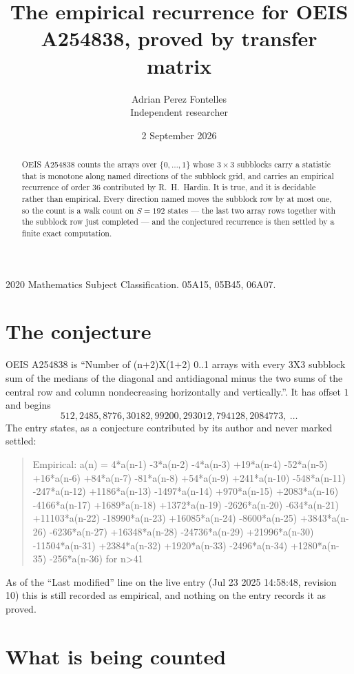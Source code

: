 \documentclass[11pt,a4paper]{article}
\title{The empirical recurrence for OEIS A254838, proved by transfer matrix}
\author{Adrian Perez Fontelles\\ \small Independent researcher}
\date{2 September 2026}
\theoremstyle{plain}
\theoremstyle{definition}
\begin{document}
\maketitle

\begin{abstract}
OEIS A254838 counts the arrays over $\{0,\dots,1\}$ whose $3\times3$ subblocks carry a
statistic that is monotone along named directions of the subblock grid, and carries an
empirical recurrence of order $36$ contributed by R.~H.~Hardin. It is true, and it is
decidable rather than empirical. Every direction named moves the subblock row by at most one,
so the count is a walk count on $S=192$ states --- the last two array rows together with the
subblock row just completed --- and the conjectured recurrence is then settled by a finite
exact computation.
\end{abstract}

\noindent\small 2020 Mathematics Subject Classification. 05A15, 05B45, 06A07.\normalsize

\section{The conjecture}

OEIS A254838 is ``Number of (n+2)X(1+2) 0..1 arrays with every 3X3 subblock sum of the medians of the diagonal and antidiagonal minus the two sums of the central row and column nondecreasing horizontally and vertically.''. It has offset $1$ and begins
\[
512, 2485, 8776, 30182, 99200, 293012, 794128, 2084773,\ \dots
\]
The entry states, as a conjecture contributed by its author and never marked settled:
\begin{quote}
Empirical: a(n) = 4*a(n-1) -3*a(n-2) -4*a(n-3) +19*a(n-4) -52*a(n-5) +16*a(n-6) +84*a(n-7) -81*a(n-8) +54*a(n-9) +241*a(n-10) -548*a(n-11) -247*a(n-12) +1186*a(n-13) -1497*a(n-14) +970*a(n-15) +2083*a(n-16) -4166*a(n-17) +1689*a(n-18) +1372*a(n-19) -2626*a(n-20) -634*a(n-21) +11103*a(n-22) -18990*a(n-23) +16085*a(n-24) -8600*a(n-25) +3843*a(n-26) -6236*a(n-27) +16348*a(n-28) -24736*a(n-29) +21996*a(n-30) -11504*a(n-31) +2384*a(n-32) +1920*a(n-33) -2496*a(n-34) +1280*a(n-35) -256*a(n-36) for n>41
\end{quote}
As of the ``Last modified'' line on the live entry (Jul 23 2025 14:58:48, revision 10) this is still
recorded as empirical, and nothing on the entry records it as proved.

\section{What is being counted}
\end{document}
